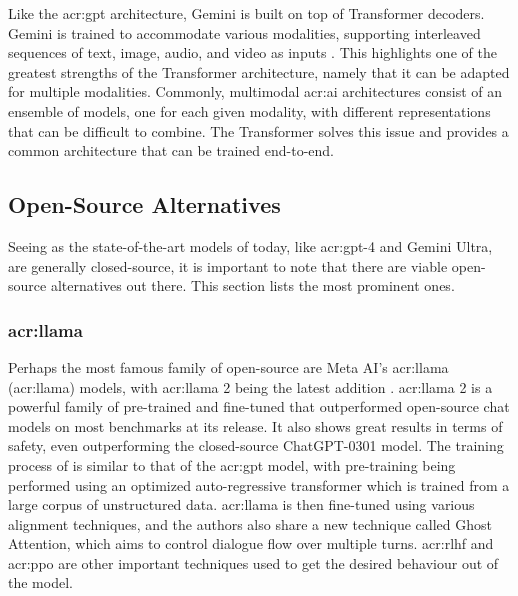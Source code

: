 Like the \acrshort{acr:gpt} architecture, Gemini is built on top of Transformer decoders. Gemini is trained to accommodate various modalities, supporting interleaved sequences of text, image, audio, and video as inputs \citep[3-4]{geminiteamGeminiFamilyHighly2023}. This highlights one of the greatest strengths of the Transformer architecture, namely that it can be adapted for multiple modalities. Commonly, multimodal \acrshort{acr:ai} architectures consist of an ensemble of models, one for each given modality, with different representations that can be difficult to combine. The Transformer solves this issue and provides a common architecture that can be trained end-to-end.

\subsection{Open-Source Alternatives}\label{subsec:open-source-llms}

Seeing as the state-of-the-art models of today, like \acrshort{acr:gpt}-4 and Gemini Ultra, are generally closed-source, it is important to note that there are viable open-source alternatives out there. This section lists the most prominent ones.

\subsubsection[LLaMA]{\acrshort{acr:llama}}

Perhaps the most famous family of open-source  are Meta AI's \acrshort{acr:llama} (\acrlong{acr:llama}) models, with \acrshort{acr:llama} 2 being the latest addition \citep{touvronLlamaOpenFoundation2023a}. \acrshort{acr:llama} 2 is a powerful family of pre-trained and fine-tuned  that outperformed open-source chat models on most benchmarks at its release. It also shows great results in terms of safety, even outperforming the closed-source ChatGPT-0301 model. The training process of  is similar to that of the \acrshort{acr:gpt} model, with pre-training being performed using an optimized auto-regressive transformer which is trained from a large corpus of unstructured data. \acrshort{acr:llama} is then fine-tuned using various alignment techniques, and the authors also share a new technique called Ghost Attention, which aims to control dialogue flow over multiple turns. \gls{acr:rlhf} and \gls{acr:ppo} are other important techniques used to get the desired behaviour out of the model.

